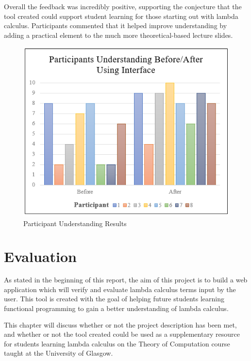 \documentclass[a4paper,11pt]{report}
\begin{document}
Overall the feedback was incredibly positive, supporting the conjecture that the tool created could support student learning for those starting out with lambda calculus. Participants commented that it helped improve understanding by adding a practical element to the much more theoretical-based lecture slides.


\begin{figure}[h]
	\includegraphics{images/participant_understanding}
	\centering
	\caption{Participant Understanding Results}
	\label{participant_understanding}
\end{figure}

\chapter{Evaluation}

As stated in the beginning of this report, the aim of this project is to build a web application which will verify and evaluate lambda calculus terms input by the user. This tool is created with the goal of helping future students learning functional programming to gain a better understanding of lambda calculus.

This chapter will discuss whether or not the project description has been met, and whether or not the tool created could be used as a supplementary resource for students learning lambda calculus on the Theory of Computation course taught at the University of Glasgow.
\end{document}
